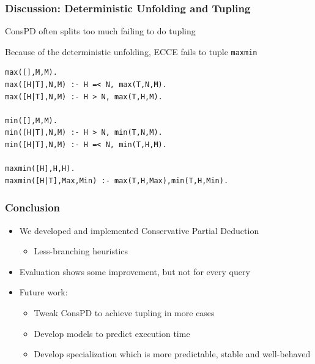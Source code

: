\documentclass[xcolor=table]{beamer}
\begin{document}
\begin{frame}[fragile]
  \frametitle{Discussion: Deterministic Unfolding and Tupling}
\begin{center}
  ConsPD often splits too much failing to do tupling
\end{center}

\pause

\begin{center}
  Because of the deterministic unfolding, ECCE fails to tuple \lstinline{maxmin}
\end{center}

\begin{lstlisting}
max([],M,M).
max([H|T],N,M) :- H =< N, max(T,N,M).
max([H|T],N,M) :- H > N, max(T,H,M).

min([],M,M).
min([H|T],N,M) :- H > N, min(T,N,M).
min([H|T],N,M) :- H =< N, min(T,H,M).

maxmin([H],H,H).
maxmin([H|T],Max,Min) :- max(T,H,Max),min(T,H,Min).
\end{lstlisting}
\end{frame}


\begin{frame}[fragile]
  \frametitle{Conclusion}
  \begin{itemize}
    \item We developed and implemented Conservative Partial Deduction
    \begin{itemize}
      \item Less-branching heuristics
    \end{itemize}
    \item Evaluation shows some improvement, but not for every query
    \item Future work:
    \begin{itemize}
      \item Tweak ConsPD to achieve tupling in more cases
      \item Develop models to predict execution time
      \item Develop specialization which is more predictable, stable and well-behaved
    \end{itemize}
  \end{itemize}
\end{frame}
\end{document}
